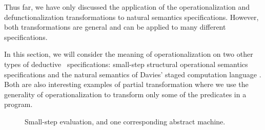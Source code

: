 Thus far, we have only discussed the application of the
operationalization and defunctionalization transformations to natural
semantics specifications. However, both transformations are general
and can be applied to many different specifications. 

In this section, we will consider the meaning of
operationalization on two other types of deductive
\sls~specifications: small-step structural operational semantics
specifications and the natural semantics of Davies' staged computation
language \rowan. Both are also interesting examples of partial
transformation where we use the generality of operationalization
to transform only some of the predicates in a program.






\begin{figure}[tp]
\begin{minipage}[b]{0.450\linewidth}
\end{minipage}
\hspace{0.5cm}
\begin{minipage}[b]{0.50\linewidth}
\end{minipage}
\caption{Small-step evaluation, and one corresponding abstract machine.}
\label{fig:cbv-sos}
\end{figure}

